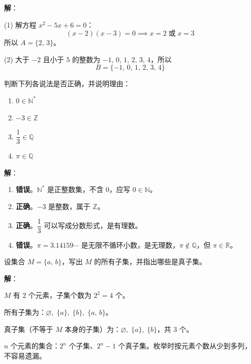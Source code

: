 \documentclass[12pt, a4paper]{ctexart}
\begin{document}
\textbf{解}：

(1) 解方程 $x^2 - 5x + 6 = 0$：
\[
(x-2)(x-3) = 0 \implies x = 2 \;\text{或}\; x = 3
\]
所以 $A = \{2,\, 3\}$。

(2) 大于 $-2$ 且小于 $5$ 的整数为 $-1,\, 0,\, 1,\, 2,\, 3,\, 4$，所以
\[
B = \{-1,\, 0,\, 1,\, 2,\, 3,\, 4\}
\]

\begin{examplebox}[【例题2】元素与集合的关系]
判断下列各说法是否正确，并说明理由：
\begin{enumerate}[label=(\arabic*), leftmargin=2em]
  \item $0 \in \mathbb{N}^*$
  \item $-3 \in \mathbb{Z}$
  \item $\dfrac{1}{3} \in \mathbb{Q}$
  \item $\pi \in \mathbb{Q}$
\end{enumerate}
\end{examplebox}

\textbf{解}：
\begin{enumerate}[label=(\arabic*), leftmargin=2em]
  \item \textbf{错误}。$\mathbb{N}^*$ 是正整数集，不含 $0$，应写 $0 \in \mathbb{N}$。
  \item \textbf{正确}。$-3$ 是整数，属于 $\mathbb{Z}$。
  \item \textbf{正确}。$\dfrac{1}{3}$ 可以写成分数形式，是有理数。
  \item \textbf{错误}。$\pi = 3.14159\cdots$ 是无限不循环小数，是无理数，$\pi \notin \mathbb{Q}$，但 $\pi \in \mathbb{R}$。
\end{enumerate}

\begin{examplebox}[【例题3】子集与子集个数]
设集合 $M = \{a,\, b\}$，写出 $M$ 的所有子集，并指出哪些是真子集。
\end{examplebox}

\textbf{解}：

$M$ 有 $2$ 个元素，子集个数为 $2^2 = 4$ 个。

所有子集为：$\varnothing,\; \{a\},\; \{b\},\; \{a,\, b\}$。

真子集（不等于 $M$ 本身的子集）为：$\varnothing,\; \{a\},\; \{b\}$，共 $3$ 个。

\begin{tipbox}[方法总结]
$n$ 个元素的集合：$2^n$ 个子集、$2^n - 1$ 个真子集。枚举时按元素个数从少到多列，不容易遗漏。
\end{tipbox}
\end{document}
